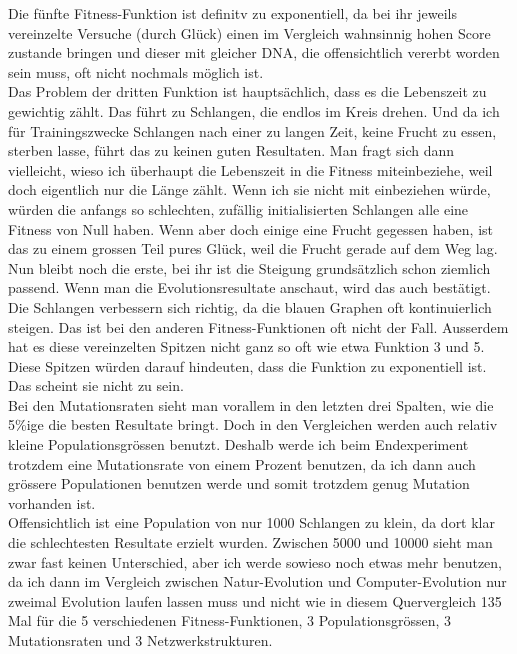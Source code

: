 \documentclass[11pt,a4paper,ngerman]{article}
\begin{document}
Die fünfte Fitness-Funktion ist definitv zu exponentiell, da bei ihr jeweils vereinzelte Versuche (durch Glück) einen im Vergleich wahnsinnig hohen Score zustande bringen und dieser mit gleicher DNA, die offensichtlich vererbt worden sein muss, oft nicht nochmals möglich ist.\\

Das Problem der dritten Funktion ist hauptsächlich, dass es die Lebenszeit zu gewichtig zählt. Das führt zu Schlangen, die endlos im Kreis drehen. Und da ich für Trainingszwecke Schlangen nach einer zu langen Zeit, keine Frucht zu essen, sterben lasse, führt das zu keinen guten Resultaten. Man fragt sich dann vielleicht, wieso ich überhaupt die Lebenszeit in die Fitness miteinbeziehe, weil doch eigentlich nur die Länge zählt. Wenn ich sie nicht mit einbeziehen würde, würden die anfangs so schlechten, zufällig initialisierten Schlangen alle eine Fitness von Null haben. Wenn aber doch einige eine Frucht gegessen haben, ist das zu einem grossen Teil pures Glück, weil die Frucht gerade auf dem Weg lag.\\

Nun bleibt noch die erste, bei ihr ist die Steigung grundsätzlich schon ziemlich passend. Wenn man die Evolutionsresultate anschaut, wird das auch bestätigt. Die Schlangen verbessern sich richtig, da die blauen Graphen oft kontinuierlich steigen. Das ist bei den anderen Fitness-Funktionen oft nicht der Fall. Ausserdem hat es diese vereinzelten Spitzen nicht ganz so oft wie etwa Funktion 3 und 5. Diese Spitzen würden darauf hindeuten, dass die Funktion zu exponentiell ist. Das scheint sie nicht zu sein.\\

Bei den Mutationsraten sieht man vorallem in den letzten drei Spalten, wie die 5\%ige die besten Resultate bringt. Doch in den Vergleichen werden auch relativ kleine Populationsgrössen benutzt. Deshalb werde ich beim Endexperiment trotzdem eine Mutationsrate von einem Prozent benutzen, da ich dann auch grössere Populationen benutzen werde und somit trotzdem genug Mutation vorhanden ist.\\

Offensichtlich ist eine Population von nur 1000 Schlangen zu klein, da dort klar die schlechtesten Resultate erzielt wurden. Zwischen 5000 und 10000 sieht man zwar fast keinen Unterschied, aber ich werde sowieso noch etwas mehr benutzen, da ich dann im Vergleich zwischen Natur-Evolution und Computer-Evolution nur zweimal Evolution laufen lassen muss und nicht wie in diesem Quervergleich 135 Mal für die 5 verschiedenen Fitness-Funktionen, 3 Populationsgrössen, 3 Mutationsraten und 3 Netzwerkstrukturen.\\
\end{document}
